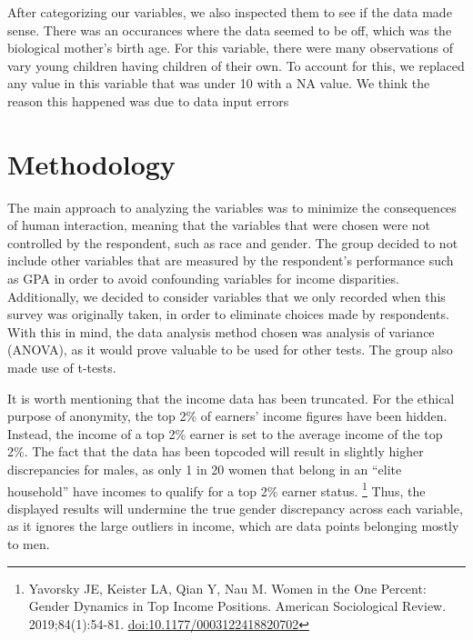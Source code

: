 \documentclass[
]{article}
\begin{document}
After categorizing our variables, we also inspected them to see if the
data made sense. There was an occurances where the data seemed to be
off, which was the biological mother's birth age. For this variable,
there were many observations of vary young children having children of
their own. To account for this, we replaced any value in this variable
that was under 10 with a NA value. We think the reason this happened was
due to data input errors

\hypertarget{methodology}{%
\section{Methodology}\label{methodology}}

The main approach to analyzing the variables was to minimize the
consequences of human interaction, meaning that the variables that were
chosen were not controlled by the respondent, such as race and gender.
The group decided to not include other variables that are measured by
the respondent's performance such as GPA in order to avoid confounding
variables for income disparities. Additionally, we decided to consider
variables that we only recorded when this survey was originally taken,
in order to eliminate choices made by respondents. With this in mind,
the data analysis method chosen was analysis of variance (ANOVA), as it
would prove valuable to be used for other tests. The group also made use
of t-tests.

It is worth mentioning that the income data has been truncated. For the
ethical purpose of anonymity, the top 2\% of earners' income figures
have been hidden. Instead, the income of a top 2\% earner is set to the
average income of the top 2\%. The fact that the data has been topcoded
will result in slightly higher discrepancies for males, as only 1 in 20
women that belong in an ``elite household'' have incomes to qualify for
a top 2\% earner status. \footnote{Yavorsky JE, Keister LA, Qian Y, Nau
  M. Women in the One Percent: Gender Dynamics in Top Income Positions.
  American Sociological Review. 2019;84(1):54-81.
  \url{doi:10.1177/0003122418820702}} Thus, the displayed results will
undermine the true gender discrepancy across each variable, as it
ignores the large outliers in income, which are data points belonging
mostly to men.
\end{document}
